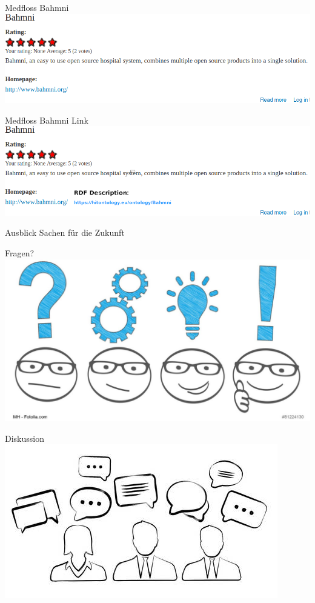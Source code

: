 \documentclass[aspectratio=1610,12pt]{beamer}
\begin{document}
\begin{frame}{Medfloss Bahmni}
  \includegraphics[width=\textwidth]{img/medfloss-bahmni.png}
\end{frame}

\begin{frame}{Medfloss Bahmni Link}
  \includegraphics[width=\textwidth]{img/medfloss-bahmni-link.png}
\end{frame}

\begin{frame}{Ausblick}
  Sachen für die Zukunft
\end{frame}

\begin{frame}{Fragen?}
  \centering
  \vspace{-0.5cm}
  \includegraphics[width=\textwidth]{img/fragen.png}
\end{frame}

\begin{frame}{Diskussion}
  \centering
  \vspace{-0.5cm}
  \includegraphics[width=\textwidth]{img/discussion.png}
\end{frame}
\end{document}
